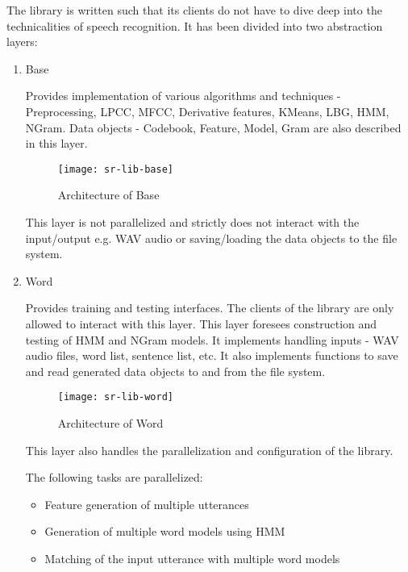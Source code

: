 The library is written such that its clients do not have to dive deep into the technicalities of speech recognition. It has been divided into two abstraction layers:

\begin{enumerate}

\item Base

Provides implementation of various algorithms and techniques - Preprocessing, LPCC, MFCC, Derivative features, KMeans, LBG, HMM, NGram. Data objects - Codebook, Feature, Model, Gram are also described in this layer.

\begin{figure}[h!]
    \centering
    \texttt{[image: sr-lib-base]}
    \label{fig:sr-lib-base}
    \caption{Architecture of Base}
\end{figure}

This layer is not parallelized and strictly does not interact with the input/output e.g. WAV audio or saving/loading the data objects to the file system.

\newpage 

\item Word

Provides training and testing interfaces. The clients of the library are only allowed to interact with this layer.
This layer foresees construction and testing of HMM and NGram models. It implements handling inputs - WAV audio files, word list, sentence list, etc. It also implements functions to save and read generated data objects to and from the file system.

\begin{figure}[h!]
    \centering
    \texttt{[image: sr-lib-word]}
    \label{fig:sr-lib-word}
    \caption{Architecture of Word}
\end{figure}

This layer also handles the parallelization and configuration of the library.

The following tasks are parallelized:
\begin{itemize}
    \item Feature generation of multiple utterances
    \item Generation of multiple word models using HMM
    \item Matching of the input utterance with multiple word models
\end{itemize}


\end{enumerate}
